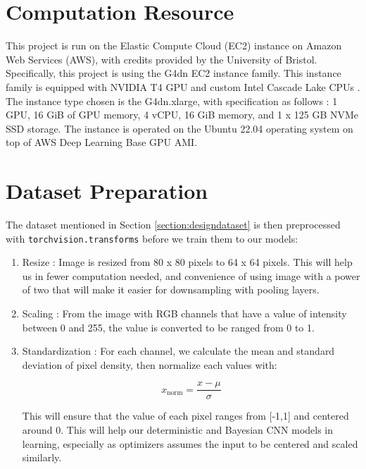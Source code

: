 \documentclass[ %
                    author={Revalda Putawara},
                supervisor={Dr. James Pope},
                    degree={MSc},
                     title={Robustness of Bayesian Neural Networks Design Choices Against Weight and Bias Perturbation Induced by Single Event Upsets (SEUs)},
                      type={},
                      year={2025}]{dissertation}
\begin{document}
\section{Computation Resource}

This project is run on the Elastic Compute Cloud (EC2) instance on Amazon Web Services (AWS), with credits provided by the University of Bristol. Specifically, this project is using the G4dn EC2 instance family. This instance family is equipped with NVIDIA T4 GPU and custom Intel Cascade Lake CPUs \cite{amazonAmazonInstances}. The instance type chosen is the G4dn.xlarge, with specification as follows \cite{amazonCloudCompute}: 1 GPU, 16 GiB of GPU memory, 4 vCPU, 16 GiB memory, and 1 x 125 GB NVMe SSD storage. The instance is operated on the Ubuntu 22.04 operating system on top of AWS Deep Learning Base GPU AMI. 

\section{Dataset Preparation}

The dataset mentioned in Section \ref{section:designdataset} is then preprocessed with \texttt{torchvision.transforms} before we train them to our models:
\begin{enumerate}
\item Resize : Image is resized from 80 x 80 pixels to 64 x 64 pixels. This will help us in fewer computation needed, and convenience of using image with a power of two that will make it easier for downsampling with pooling layers.
\item Scaling : From the image with RGB channels that have a value of intensity between 0 and 255, the value is converted to be ranged from 0 to 1.
\item Standardization : For each channel, we calculate the mean and standard deviation of pixel density, then normalize each values with:

\begin{equation}
x_{\text{norm}} = \frac{x - \mu}{\sigma}
\end{equation}

This will ensure that the value of each pixel ranges from [-1,1] and centered around 0. This will help our deterministic and Bayesian CNN models in learning, especially as optimizers assumes the input to be centered and scaled similarly. 


\end{enumerate}
\end{document}
